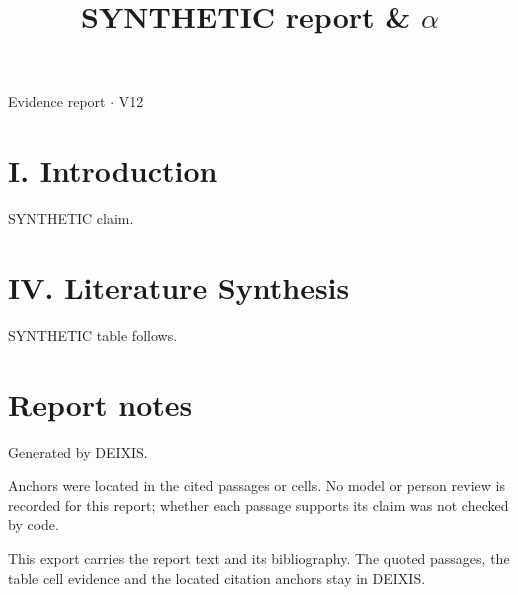 \documentclass[journal]{IEEEtran}
\begin{document}
\title{SYNTHETIC report \& \ensuremath{\alpha}}

\maketitle

\noindent Evidence report \ensuremath{\cdot} V12

\section*{I. Introduction}

SYNTHETIC claim. \cite{Synth26}

\section*{IV. Literature Synthesis}

SYNTHETIC table follows.

\section*{Report notes}

Generated by DEIXIS.

Anchors were located in the cited passages or cells. No model or person review is recorded for this report; whether each passage supports its claim was not checked by code.

This export carries the report text and its bibliography. The quoted passages, the table cell evidence and the located citation anchors stay in DEIXIS.




\end{document}
